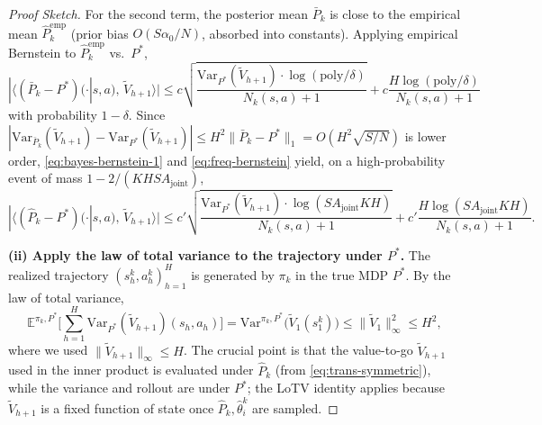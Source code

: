 \documentclass{article}
\begin{document}
\begin{proof}[Proof Sketch]
For the second term, the posterior mean $\bar{P}_k$ is close to the empirical mean $\hat{P}^{\mathrm{emp}}_k$ (prior bias $O(S\alpha_0/N)$, absorbed into constants). Applying empirical Bernstein \citep[Lemma 3]{azar2017minimax} to $\hat{P}^{\mathrm{emp}}_k$ vs.\ $P^*$,
\begin{equation}
\label{eq:freq-bernstein}
|\langle (\bar{P}_k - P^*)(\cdot|s,a),\, \widetilde{V}_{h+1}\rangle| \leq c\sqrt{\frac{\mathrm{Var}_{P^*}(\widetilde{V}_{h+1}) \cdot \log(\mathrm{poly}/\delta)}{N_k(s, a) + 1}} + c\frac{H \log(\mathrm{poly}/\delta)}{N_k(s, a) + 1}
\end{equation}
with probability $1 - \delta$. Since $|\mathrm{Var}_{\bar{P}_k}(\widetilde{V}_{h+1}) - \mathrm{Var}_{P^*}(\widetilde{V}_{h+1})| \leq H^2 \|\bar{P}_k - P^*\|_1 = O(H^2 \sqrt{S/N})$ is lower order, \eqref{eq:bayes-bernstein-1} and \eqref{eq:freq-bernstein} yield, on a high-probability event of mass $1 - 2/(KHSA_{\mathrm{joint}})$,
\begin{equation}
\label{eq:bernstein-combined}
|\langle (\hat{P}_k - P^*)(\cdot|s,a),\, \widetilde{V}_{h+1}\rangle| \leq c'\sqrt{\frac{\mathrm{Var}_{P^*}(\widetilde{V}_{h+1}) \cdot \log(SA_{\mathrm{joint}}KH)}{N_k(s, a) + 1}} + c'\frac{H \log(SA_{\mathrm{joint}}KH)}{N_k(s, a) + 1}.
\end{equation}

\textbf{(ii) Apply the law of total variance to the trajectory under $P^*$.} The realized trajectory $(s_h^k, a_h^k)_{h=1}^H$ is generated by $\pi_k$ in the true MDP $P^*$. By the law of total variance,
\begin{equation}
\mathbb{E}^{\pi_k, P^*}\bigg[\sum_{h=1}^H \mathrm{Var}_{P^*}(\widetilde{V}_{h+1})(s_h, a_h)\bigg] = \mathrm{Var}^{\pi_k, P^*}\bigg(\widetilde{V}_{1}(s_1^k)\bigg) \leq \|\widetilde{V}_1\|_\infty^2 \leq H^2,
\end{equation}
where we used $\|\widetilde{V}_{h+1}\|_\infty \leq H$. The crucial point is that the value-to-go $\widetilde{V}_{h+1}$ used in the inner product is evaluated under $\hat{P}_k$ (from \eqref{eq:trans-symmetric}), while the variance and rollout are under $P^*$; the LoTV identity applies because $\widetilde{V}_{h+1}$ is a fixed function of state once $\hat{P}_k, \hat{\theta}_i^k$ are sampled.


\end{proof}
\end{document}

